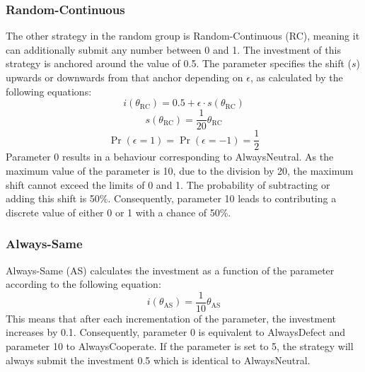 \documentclass[11pt]{article}
\begin{document}
\subsubsection*{Random-Continuous}
The other strategy in the random group is Random-Continuous (RC), meaning it can additionally submit any number between 0 and 1.
The investment of this strategy is anchored around the value of 0.5.
The parameter specifies the shift ($s$) upwards or downwards from that anchor depending on $\epsilon$, as calculated by the following equations:
\begin{equation}
	i(\theta_{\mathrm{RC}}) = 0.5 + \epsilon \cdot s(\theta_{\mathrm{RC}})
	\label{eq:RC_i_eq}
\end{equation}
\begin{equation}
	s(\theta_{\mathrm{RC}}) = \frac{1}{20} {\theta_{\mathrm{RC}}}
	\label{eq:RC_s_eq}
\end{equation}
\begin{equation}
	\Pr(\epsilon = 1) = \Pr(\epsilon = -1) = \frac{1}{2}
	\label{eq:RC_e_prob}
\end{equation}
Parameter 0 results in a behaviour corresponding to AlwaysNeutral.
As the maximum value of the parameter is 10, due to the division by 20, the maximum shift cannot exceed the limits of 0 and 1.
The probability of subtracting or adding this shift is 50\%.
Consequently, parameter 10 leads to contributing a discrete value of either 0 or 1 with a chance of 50\%. 


\subsubsection*{Always-Same}
Always-Same (AS) calculates the investment as a function of the parameter according to the following equation: 
\begin{equation}
	i(\theta_{\mathrm{AS}}) = \frac{1}{10} \theta_{\mathrm{AS}}
	\label{eq:AS_i_eq}
\end{equation}
This means that after each incrementation of the parameter, the investment increases by 0.1.
Consequently, parameter 0 is equivalent to AlwaysDefect and parameter 10 to AlwaysCooperate.
If the parameter is set to 5, the strategy will always submit the investment 0.5 which is identical to AlwaysNeutral.
\end{document}
